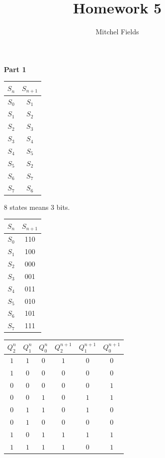 \documentclass{article}
\title{Homework 5}
\author{Mitchel Fields}
\begin{document}
\maketitle

\begin{itemize}
	\item [\textbf{Part 1}]\hspace{0pt}\\

	\begin{tabular}{c | c}
	$S_n$ & $S_{n+1}$ \\ \hline
	$S_0$ & $S_1$ \\
	$S_1$ & $S_2$ \\
	$S_2$ & $S_3$ \\
	$S_3$ & $S_4$ \\
	$S_4$ & $S_5$ \\
	$S_5$ & $S_2$ \\
	$S_6$ & $S_7$ \\
	$S_7$ & $S_6$
	\end{tabular}

	8 states means 3 bits.
	
	\begin{tabular}{c | c}
	$S_n$ & $S_{n+1}$ \\ \hline
	$S_0$ & 110 \\
	$S_1$ & 100 \\
	$S_2$ & 000 \\
	$S_3$ & 001 \\
	$S_4$ & 011 \\
	$S_5$ & 010 \\
	$S_6$ & 101 \\
	$S_7$ & 111
	\end{tabular}

	\begin{tabular}{c c c | c c c}
	$Q^n_2$ & $Q^n_1$ & $Q^n_0$ & $Q^{n+1}_2$ & $Q^{n+1}_1$ & $Q^{n+1}_0$ \\ \hline
	$1$ & $1$ & $0$ & $1$ & $0$ & $0$ \\
	$1$ & $0$ & $0$ & $0$ & $0$ & $0$ \\
	$0$ & $0$ & $0$ & $0$ & $0$ & $1$ \\
	$0$ & $0$ & $1$ & $0$ & $1$ & $1$ \\
	$0$ & $1$ & $1$ & $0$ & $1$ & $0$ \\
	$0$ & $1$ & $0$ & $0$ & $0$ & $0$ \\
	$1$ & $0$ & $1$ & $1$ & $1$ & $1$ \\
	$1$ & $1$ & $1$ & $1$ & $0$ & $1$
	\end{tabular}


\end{itemize}
\end{document}
